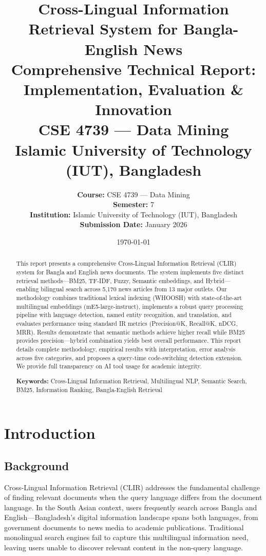 \documentclass[12pt,a4paper]{report}
\title{\textbf{Cross-Lingual Information Retrieval System for Bangla-English News} \\
        \large Comprehensive Technical Report: Implementation, Evaluation \& Innovation \\
        \vspace{0.5cm}
        \normalsize CSE 4739 --- Data Mining \\
        \normalsize Islamic University of Technology (IUT), Bangladesh}
\author{\textbf{Course:} CSE 4739 --- Data Mining \\
        \textbf{Semester:} 7 \\
        \textbf{Institution:} Islamic University of Technology (IUT), Bangladesh \\
        \textbf{Submission Date:} January 2026}
\date{\today}
\begin{document}
\maketitle

\begin{abstract}
    \noindent This report presents a comprehensive Cross-Lingual Information Retrieval (CLIR) system for Bangla and English news documents. The system implements five distinct retrieval methods---BM25, TF-IDF, Fuzzy, Semantic embeddings, and Hybrid---enabling bilingual search across 5,170 news articles from 13 major outlets. Our methodology combines traditional lexical indexing (WHOOSH) with state-of-the-art multilingual embeddings (mE5-large-instruct), implements a robust query processing pipeline with language detection, named entity recognition, and translation, and evaluates performance using standard IR metrics (Precision@K, Recall@K, nDCG, MRR). Results demonstrate that semantic methods achieve higher recall while BM25 provides precision---hybrid combination yields best overall performance. This report details complete methodology, empirical results with interpretation, error analysis across five categories, and proposes a query-time code-switching detection extension. We provide full transparency on AI tool usage for academic integrity.
    
    \vspace{0.3cm}
    \noindent \textbf{Keywords:} Cross-Lingual Information Retrieval, Multilingual NLP, Semantic Search, BM25, Information Ranking, Bangla-English Retrieval
\end{abstract}

\newpage
\tableofcontents

\newpage

\chapter{Introduction}

\section{Background}

Cross-Lingual Information Retrieval (CLIR) addresses the fundamental challenge of finding relevant documents when the query language differs from the document language. In the South Asian context, users frequently search across Bangla and English---Bangladesh's digital information landscape spans both languages, from government documents to news media to academic publications. Traditional monolingual search engines fail to capture this multilingual information need, leaving users unable to discover relevant content in the non-query language.
\end{document}
